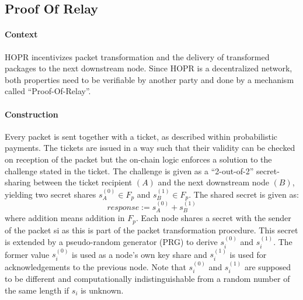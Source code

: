 \subsection{Proof Of Relay}

\paragraph{Context}
HOPR incentivizes packet transformation and the delivery of transformed packages to the next downstream node. Since HOPR is a decentralized network, both properties need to be verifiable by another party and done by a mechanism called “Proof-Of-Relay”.
\paragraph{Construction} 
Every packet is sent together with a ticket, as described within probabilistic payments. The tickets are issued in a way such that their validity can be checked on reception of the packet but the on-chain logic enforces a solution to the challenge stated in the ticket.
\newline The challenge is given as a “2-out-of-2” secret-sharing between the ticket recipient $(A)$ and the next downstream node $(B)$, yielding two secret shares $s_A^{(0)}\in F_p$ and $s_B^{(1)}\in F_p$. The shared secret is given as: $$response:=s_A^{(0)}+s_B^{(1)}$$ where addition means addition in $F_p$.
Each node shares a secret with the sender of the packet si as this is part of the packet transformation procedure. This secret is extended by a pseudo-random generator (PRG) to derive $s_i^{(0)}$ and $s_i^{(1)}$. 
\newline The former value $s_i^{(0)}$ is used as a node’s own key share and $s_i^{(1)}$ is used for acknowledgements to the previous node. Note that $s_i^{(0)}$ and $s_i^{(1)}$ are supposed to be different and computationally indistinguishable from a random number of the same length if $s_i$ is unknown.


